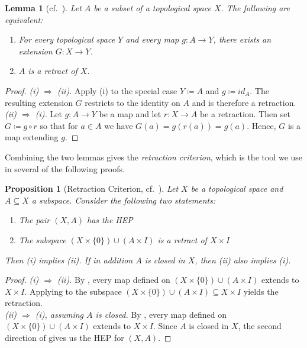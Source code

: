 \documentclass[11pt, a4paper, english]{article}
\theoremstyle{plain}
\newtheorem{proposition}[theorem]{Proposition}
\newtheorem{lemma}[theorem]{Lemma}
\theoremstyle{definition}
\theoremstyle{remark}
\numberwithin{equation}{section}
\numberwithin{theorem}{section}
\begin{document}
\begin{lemma} [cf.\ {\cite[Hilfssatz, page 39]{WAL}}] \label{lem:retract}
    Let $A$ be a subset of a topological space $X$. The following are equivalent:
    \begin{enumerate}
        \renewcommand{\labelenumi}{(\roman{enumi})}
        \item For every topological space $Y$ and every map $g \colon A \to Y$, there exists an extension $G \colon X \to Y$.
        \item $A$ is a retract of $X$.
    \end{enumerate}
\end{lemma}

\begin{proof}
    \emph{(i) $\Rightarrow$ (ii).}
    Apply (i) to the special case $Y \coloneqq A$ and $g \coloneqq id_A$. The resulting extension $G$ restricts to the
    identity on $A$ and is therefore a retraction. \\
    \emph{(ii) $\Rightarrow$ (i).} 
    Let $g \colon A \to Y$ be a map and let $r \colon X \to A$ be a retraction. Then set $G \coloneqq g \circ r$ so that for $a \in A$ we have $G(a) = g(r(a)) = g(a)$. Hence, $G$ is a map extending $g$. 
\end{proof}
Combining the two lemmas gives the \emph{retraction criterion}, which is the tool we use in several of the following proofs.

\begin{proposition}[Retraction Criterion, cf.\ {\cite[(5.1.2 Proposition)]{Tammo}}]  \label{prop:retractioncriterion}
    Let $X$ be a topological space and $A \subseteq X$ a subspace. Consider the following two statements:
    \begin{enumerate}
    \renewcommand{\labelenumi}{(\roman{enumi})}
        \item The pair $(X,A)$ has the HEP
        \item The subspace $(X \times \{ 0\}) \cup (A \times I)$ is a retract of $X \times I$
    \end{enumerate}
    Then (i) implies (ii). If in addition $A$ is closed in $X$, then (ii) also implies (i).
\end{proposition}

\begin{proof}
    \emph{(i) $\Rightarrow$ (ii).} 
    By , every map defined on  $(X \times \{0\}) \cup (A \times I)$ extends to $X \times I$. Applying  to the subspace $(X \times \{0\}) \cup (A \times I) \subseteq X \times I$ yields the retraction. \\
    \emph{(ii) $\Rightarrow$ (i), assuming $A$ is closed.} By , every map defined on $(X \times \{0\}) \cup (A \times I)$ extends to $X \times I$. Since $A$ is closed in $X$, the second direction of  gives us the HEP for $(X,A)$.
\end{proof}
\end{document}
